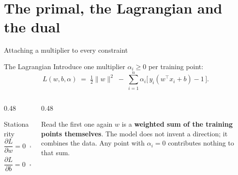 \documentclass[aspectratio=169]{beamer}
\begin{document}
\section[Primal and dual]{The primal, the Lagrangian and the dual}
\label{sec:dual}

\begin{frame}[shrink=4]{Attaching a multiplier to every constraint}
  \begin{block}{The Lagrangian}
    Introduce one multiplier $\alpha_i \ge 0$ per training point:
    \[
      L(w,b,\alpha) \;=\; \tfrac12\|w\|^2
        \;-\; \sum_{i=1}^{n} \alpha_i\bigl[\,y_i(w^\top x_i + b) - 1\,\bigr].
    \]
  \end{block}
  \begin{columns}[T]
    \begin{column}{0.48\textwidth}
      \begin{exampleblock}{Stationarity}
        \[
          \frac{\partial L}{\partial w} = 0
          \;\Longrightarrow\;
          w = \sum_i \alpha_i y_i x_i
        \]
        \[
          \frac{\partial L}{\partial b} = 0
          \;\Longrightarrow\;
          \sum_i \alpha_i y_i = 0
        \]
      \end{exampleblock}
    \end{column}
    \begin{column}{0.48\textwidth}
      \begin{alertblock}{Read the first one again}
        $w$ is a \textbf{weighted sum of the training points themselves}. The
        model does not invent a direction; it combines the data. Any point
        with $\alpha_i = 0$ contributes nothing to that sum.
      \end{alertblock}
    \end{column}
  \end{columns}
\end{frame}
\end{document}
